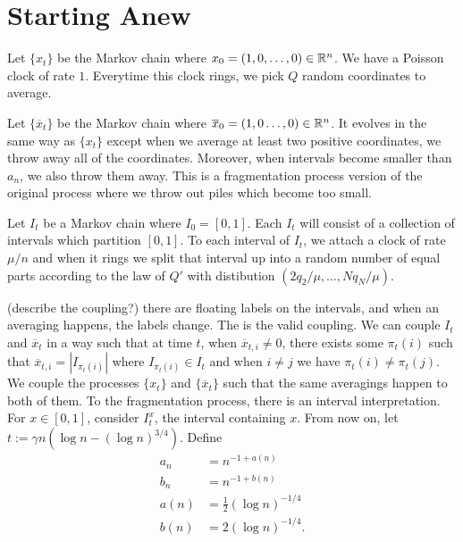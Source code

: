 \documentclass[12pt]{article}
\begin{document}
\section{Starting Anew}

\begin{defn} 
	Let $\{x_t\}$ be the Markov chain where $x_0 = (1, 0, \ldots, 0) \in \mathbb{R}^n$. We have a Poisson clock of rate $1$. Everytime this clock rings, we pick $Q$ random coordinates to average. 
\end{defn}

\begin{defn} 
	Let $\{\overline{x}_t\}$ be the Markov chain where $\overline{x}_0 = (1, 0 \ldots, 0) \in \mathbb{R}^n$. It evolves in the same way as $\{x_t\}$ except when we average at least two positive coordinates, we throw away all of the coordinates. Moreover, when intervals become smaller than $a_n$, we also throw them away. This is a fragmentation process version of the original process where we throw out piles which become too small. 
\end{defn}

\begin{defn} 
	Let $I_t$ be a Markov chain where $I_0 = [0, 1]$. Each $I_t$ will consist of a collection of intervals which partition $[0, 1]$. To each interval of $I_t$, we attach a clock of rate $\mu / n$ and when it rings we split that interval up into a random number of equal parts according to the law of $Q'$ with distibution $(2q_2 / \mu, \ldots, Nq_N /\mu)$.
\end{defn}

(describe the coupling?) there are floating labels on the intervals, and when an averaging happens, the labels change. The is the valid coupling. We can couple $I_t$ and $\overline{x}_t$ in a way such that at time $t$, when $\overline{x}_{t, i} \neq 0$, there exists some $\pi_t(i)$ such that $\overline{x}_{t, i} = |I_{\pi_t(i)}|$ where $I_{\pi_t(i)} \in I_t$ and when $i \neq j$ we have $\pi_t(i) \neq \pi_t(j)$. We couple the processes $\{x_t\}$ and $\{\overline{x}_t\}$ such that the same averagings happen to both of them. To the fragmentation process, there is an interval interpretation. For $x \in [0, 1]$, consider $I_t^x$, the interval containing $x$. From now on, let $t := \gamma n ( \log n - (\log n)^{3/4})$. Define 
\begin{align*}
	a_n & = n^{-1 + a(n)} \\
	b_n & = n^{-1 + b(n)} \\
	a(n) & = \frac{1}{2} (\log n)^{-1/4} \\
	b(n) & = 2 (\log n)^{-1/4}.
\end{align*}
\end{document}
